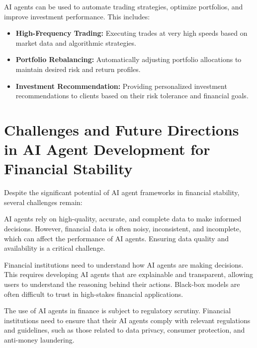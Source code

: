 \documentclass[a4paper,headinclude=on,footinclude=on,12pt,oneside]{scrbook}
\begin{document}

AI agents can be used to automate trading strategies, optimize portfolios, and improve investment performance. This includes:

\begin{itemize}
\item \textbf{High-Frequency Trading:} Executing trades at very high speeds based on market data and algorithmic strategies.
\item \textbf{Portfolio Rebalancing:} Automatically adjusting portfolio allocations to maintain desired risk and return profiles.
\item \textbf{Investment Recommendation:} Providing personalized investment recommendations to clients based on their risk tolerance and financial goals.
\end{itemize}

\section{Challenges and Future Directions in AI Agent Development for Financial Stability}

Despite the significant potential of AI agent frameworks in financial stability, several challenges remain:


AI agents rely on high-quality, accurate, and complete data to make informed decisions. However, financial data is often noisy, inconsistent, and incomplete, which can affect the performance of AI agents. Ensuring data quality and availability is a critical challenge.


Financial institutions need to understand how AI agents are making decisions. This requires developing AI agents that are explainable and transparent, allowing users to understand the reasoning behind their actions. Black-box models are often difficult to trust in high-stakes financial applications.


The use of AI agents in finance is subject to regulatory scrutiny. Financial institutions need to ensure that their AI agents comply with relevant regulations and guidelines, such as those related to data privacy, consumer protection, and anti-money laundering.

\end{document}
